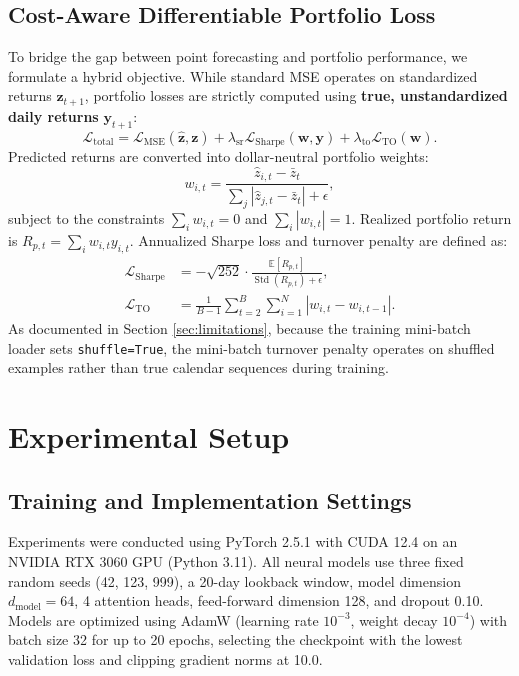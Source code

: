 \documentclass[10pt,twocolumn,a4paper]{article}
\begin{document}
\subsection{Cost-Aware Differentiable Portfolio Loss}
To bridge the gap between point forecasting and portfolio performance, we formulate a hybrid objective. While standard MSE operates on standardized returns $\mathbf{z}_{t+1}$, portfolio losses are strictly computed using \textbf{true, unstandardized daily returns} $\mathbf{y}_{t+1}$:
\begin{equation}
\mathcal{L}_{\mathrm{total}} = \mathcal{L}_{\mathrm{MSE}}(\widehat{\mathbf{z}}, \mathbf{z}) + \lambda_{\mathrm{sr}} \mathcal{L}_{\mathrm{Sharpe}}(\mathbf{w}, \mathbf{y}) + \lambda_{\mathrm{to}} \mathcal{L}_{\mathrm{TO}}(\mathbf{w}).
\end{equation}
Predicted returns are converted into dollar-neutral portfolio weights:
\begin{equation}
w_{i,t} = \frac{\widehat{z}_{i,t} - \bar{z}_t}{\sum_j |\widehat{z}_{j,t} - \bar{z}_t| + \epsilon},
\end{equation}
subject to the constraints $\sum_i w_{i,t} = 0$ and $\sum_i |w_{i,t}| = 1$. Realized portfolio return is $R_{p,t} = \sum_i w_{i,t} y_{i,t}$. Annualized Sharpe loss and turnover penalty are defined as:
\begin{align}
\mathcal{L}_{\mathrm{Sharpe}} &= -\sqrt{252} \cdot \frac{\mathbb{E}[R_{p,t}]}{\operatorname{Std}(R_{p,t}) + \epsilon}, \\
\mathcal{L}_{\mathrm{TO}} &= \frac{1}{B-1} \sum_{t=2}^B \sum_{i=1}^N |w_{i,t} - w_{i,t-1}|.
\end{align}
As documented in Section \ref{sec:limitations}, because the training mini-batch loader sets \texttt{shuffle=True}, the mini-batch turnover penalty operates on shuffled examples rather than true calendar sequences during training.

\section{Experimental Setup}
\subsection{Training and Implementation Settings}
Experiments were conducted using PyTorch 2.5.1 with CUDA 12.4 on an NVIDIA RTX 3060 GPU (Python 3.11). All neural models use three fixed random seeds (42, 123, 999), a 20-day lookback window, model dimension $d_{\mathrm{model}} = 64$, 4 attention heads, feed-forward dimension 128, and dropout 0.10. Models are optimized using AdamW (learning rate $10^{-3}$, weight decay $10^{-4}$) with batch size 32 for up to 20 epochs, selecting the checkpoint with the lowest validation loss and clipping gradient norms at 10.0.
\end{document}
